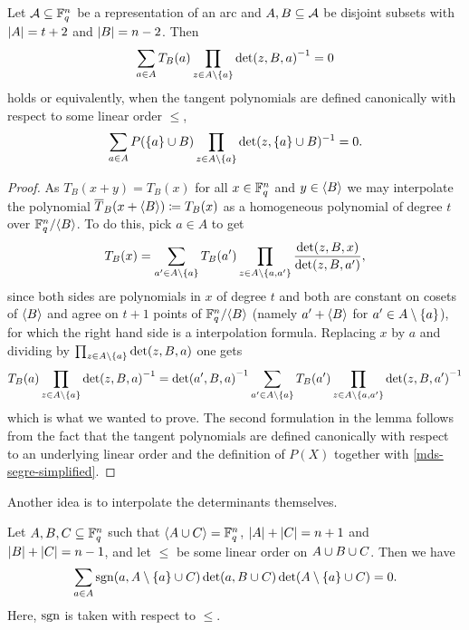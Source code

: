 \begin{lemma}
    Let $\mathcal{A}\subseteq\mathbb{F}_{q}^n$ be a representation of an arc and $A,B\subseteq \mathcal{A}$ be disjoint subsets with
    $\left\vert{A}\right\vert=t+2$ and $\left\vert{B}\right\vert=n-2$. Then
    $$
    \sum_{a\in A}{T_{B}(a)\prod_{z\in A\setminus \set a}{\det(z,B,a)}^{-1}} =0
    $$
    holds or equivalently, when the tangent polynomials are defined canonically
    with respect to some linear order $\leq$,
    $$
    \sum_{a\in A}{P(\set a\setjoin B)\prod_{z\in A\setminus\set a}\det(z,\set a\setjoin B)^{-1}}=0.
    $$
\end{lemma}
%
\begin{proof}
    As $T_B(x+y)=T_B(x)$ for all $x\in\mathbb{F}_{q}^n$ and $y\in\gen B$ we may
    interpolate the polynomial $\bar{T}_B(x+\gen B)\defeq T_{B}(x)$ as a homogeneous polynomial of
    degree $t$ over $\field{q}^n/\gen B$. To do this, pick $a\in A$ to get
    $$
    T_B(x)=\sum_{a'\in A\setminus\set a}{T_B(a')\prod_{z\in A\setminus\set{a,a'}}{\frac{\det(z,B,x)}{\det(z,B,a')}}},
    $$
    since both sides are polynomials in $x$ of degree $t$
    and both are constant on cosets of $\gen B$ and agree on $t+1$
    points of $\field{q}^n/\gen B$ (namely $a'+\gen B$
    for $a'\in A\setminus\set a$), for which the right hand side is a  interpolation formula. Replacing $x$ by $a$ and dividing by
  $\prod_{z\in A\setminus\set a}{\det(z,B,a)}$ one gets 
  $$
  T_B(a)\prod_{z\in  A\setminus\set a}{{\det(z,B,a)}^{-1}} = {\det(a',B,a)}^{-1}\sum_{a'\in A\setminus\set a}{T_B(a')\prod_{z\in A\setminus\set{a,a'}}{{\det(z,B,a')}^{-1}}}
  $$
  which is what we wanted to prove.
  The second formulation in the lemma follows from the fact that the tangent polynomials are defined canonically with respect to an underlying linear order and the definition of $P(X)$ together with \autoref{mds-segre-simplified}. 
\end{proof}

Another idea is to interpolate the determinants themselves.
\begin{lemma}\label{mds-tan-poly-interpol-det}
    Let $A,B,C\subseteq \mathbb{F}_{q}^n$ such that $\gen{A\setjoin
    C}=\field{q}^n$, $\left\vert{A}\right\vert+\left\vert{C}\right\vert=n+1$ and $\left\vert{B}\right\vert+\left\vert{C}\right\vert=n-1$, and let $\leq$
    be some linear order on $A\cup B\cup C$. Then we have
    $$
    \sum_{a\in A}{\sgn(a,A\setminus\set a\setjoin C)\det(a,B\setjoin C)\det(A\setminus\set a\setjoin C)}=0\text{.}
    $$
    Here, $\mathop\mathrm{sgn}$ is taken with respect to $\leq$.
\end{lemma}

